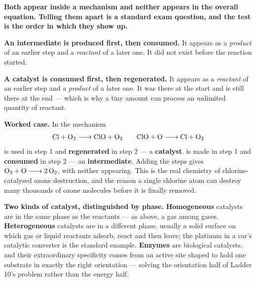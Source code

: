 \documentclass{apchem-worksheet}
\begin{document}
\begin{workedexample}
\textbf{Both appear inside a mechanism and neither appears in the
overall equation. Telling them apart is a standard exam question, and
the test is the order in which they show up.}

\textbf{An intermediate is produced first, then consumed.} It appears as
a \emph{product} of an earlier step and a \emph{reactant} of a later
one. It did not exist before the reaction started.

\textbf{A catalyst is consumed first, then regenerated.} It appears as a
\emph{reactant} of an earlier step and a \emph{product} of a later one.
It was there at the start and is still there at the end --- which is why
a tiny amount can process an unlimited quantity of reactant.

\textbf{Worked case.} In the mechanism
\[ \ce{Cl + O3 -> ClO + O2}
   \qquad
   \ce{ClO + O -> Cl + O2} \]
 is used in step 1 and \textbf{regenerated} in step 2 --- a
\textbf{catalyst}.  is made in step 1 and \textbf{consumed} in
step 2 --- an \textbf{intermediate}. Adding the steps gives
$\ce{O3 + O -> 2O2}$, with neither appearing. This is the real
chemistry of chlorine-catalysed ozone destruction, and the reason a
single chlorine atom can destroy many thousands of ozone molecules
before it is finally removed.

\textbf{Two kinds of catalyst, distinguished by phase.}
\textbf{Homogeneous} catalysts are in the same phase as the reactants
--- as  above, a gas among gases. \textbf{Heterogeneous}
catalysts are in a different phase, usually a solid surface on which gas
or liquid reactants adsorb, react and then leave; the platinum in a car's
catalytic converter is the standard example. \textbf{Enzymes} are
biological catalysts, and their extraordinary specificity comes from an
active site shaped to hold one substrate in exactly the right
orientation --- solving the orientation half of Ladder 10's problem
rather than the energy half.
\end{workedexample}
\end{document}
